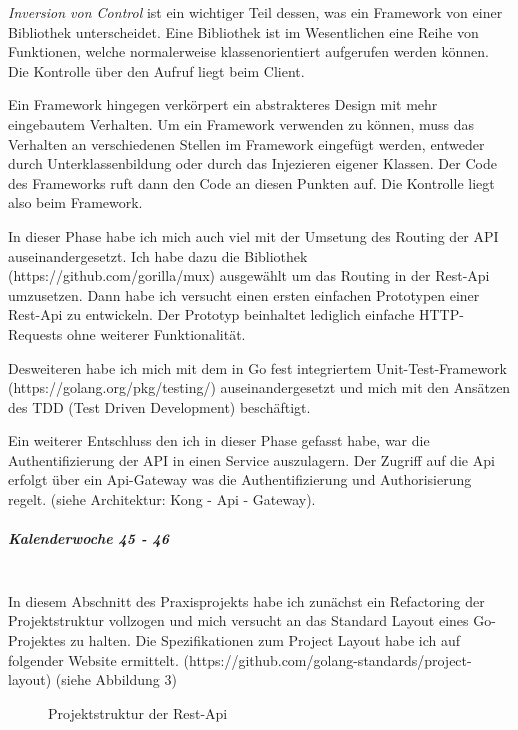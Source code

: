 \documentclass[12pt]{article}
\begin{document}
\textit{Inversion von Control} ist ein wichtiger Teil dessen, was ein Framework von einer Bibliothek unterscheidet. Eine Bibliothek ist im Wesentlichen eine Reihe von Funktionen, welche normalerweise klassenorientiert aufgerufen werden können. Die Kontrolle über den Aufruf liegt beim Client.

Ein Framework hingegen verkörpert ein abstrakteres Design mit mehr eingebautem Verhalten. Um ein Framework verwenden zu können, muss das Verhalten an verschiedenen Stellen im Framework eingefügt werden, entweder durch Unterklassenbildung oder durch das Injezieren eigener Klassen. Der Code des Frameworks ruft dann den Code an diesen Punkten auf. Die Kontrolle liegt also beim Framework.

In dieser Phase habe ich mich auch viel mit der Umsetung des Routing der API auseinandergesetzt. Ich habe dazu die Bibliothek  (https://github.com/gorilla/mux) ausgewählt um das Routing in der Rest-Api umzusetzen.
Dann habe ich versucht einen ersten einfachen Prototypen einer Rest-Api zu entwickeln. Der Prototyp beinhaltet lediglich einfache HTTP-Requests ohne weiterer Funktionalität.

Desweiteren habe ich mich mit dem in Go fest integriertem Unit-Test-Framework (https://golang.org/pkg/testing/) auseinandergesetzt und mich mit den Ansätzen des TDD (Test Driven Development) beschäftigt.

Ein weiterer Entschluss den ich in dieser Phase gefasst habe, war die Authentifizierung der API in einen Service auszulagern. Der Zugriff auf die Api erfolgt über ein Api-Gateway was die Authentifizierung und Authorisierung regelt. (siehe Architektur: Kong - Api - Gateway).

\subparagraph{Kalenderwoche 45 - 46}\mbox{}\\

In diesem Abschnitt des Praxisprojekts habe ich zunächst ein Refactoring der Projektstruktur vollzogen und mich versucht an das Standard Layout eines Go-Projektes zu halten. Die Spezifikationen zum Project Layout habe ich auf folgender Website ermittelt. (https://github.com/golang-standards/project-layout) (siehe Abbildung 3)
\bigbreak
\renewcommand*\DTstylecomment{\rmfamily\color{red}\textsc}
\begin{figure}[h!]
\centering
{}
\caption{Projektstruktur der Rest-Api}
\end{figure}
\end{document}
